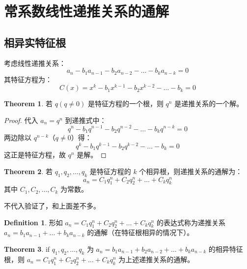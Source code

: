 \documentclass[oneside]{book}
\theoremstyle{definition}
\newtheorem{definition}{Definition}[section]
\newtheorem{theorem}{Theorem}[section]
\begin{document}
\section{常系数线性递推关系的通解}
\subsection{相异实特征根}
考虑线性递推关系：
\[
a_n - b_1 a_{n-1} - b_2 a_{n-2} - \dots - b_k a_{n-k} = 0
\]
其特征方程为：
\[
C(x) = x^k - b_1 x^{k-1} - b_2 x^{k-2} - \dots - b_k = 0
\]

\begin{theorem}
	若 \( q(q\neq 0) \) 是特征方程的一个根，则 \( q^n \) 是递推关系的一个解。
\end{theorem}

\begin{proof}
	代入 \( a_n = q^n \) 到递推式中：
	\[
	q^n - b_1 q^{n-1} - b_2 q^{n-2} - \dots - b_k q^{n-k} = 0
	\]
	两边除以 \( q^{n-k} \)（\( q \neq 0 \)）得：
	\[
	q^k - b_1 q^{k-1} - b_2 q^{k-2} - \dots - b_k = 0
	\]
	这正是特征方程，故 \( q^n \) 是解。
\end{proof}

\begin{theorem}
	若 \( q_1, q_2, \dots, q_k \) 是特征方程的 \( k \) 个相异根，则递推关系的通解为：
	\[
	a_n = C_1 q_1^n + C_2 q_2^n + \dots + C_k q_k^n
	\]
	其中 \( C_1, C_2, \dots, C_k \) 为常数。
\end{theorem}
不代入验证了，和上面差不多。
\begin{definition}
	形如 \( a_n = C_1 q_1^n + C_2 q_2^n + \dots + C_k q_k^n \) 的表达式称为递推关系 \( a_n = b_1 a_{n-1} + \dots + b_k a_{n-k} \) 的通解（在特征根相异的情况下）。
\end{definition}

\begin{theorem}
	if \( q_1, q_2, \dots, q_k \) 为 \( a_n = b_1a_{n-1} + b_2a_{n-2} + \dots + b_k a_{n-k} \) 的相异特征根，则 \( a_n = C_1 q_1^n + C_2 q_2^n + \dots + C_k q_k^n \) 为上述递推关系的通解。
\end{theorem}
\end{document}
